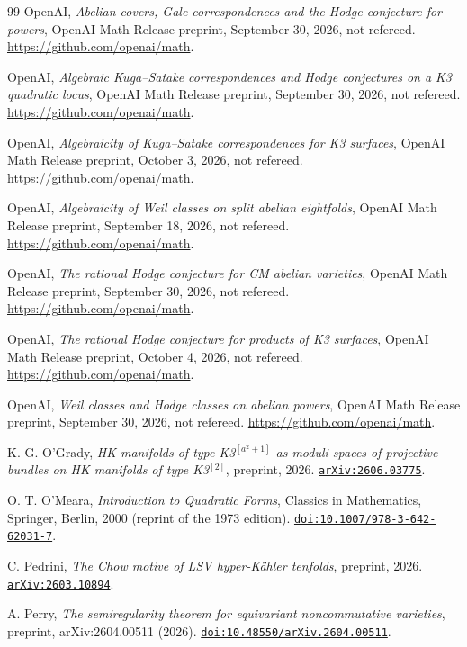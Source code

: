 \begin{thebibliography}{99}
OpenAI,
\emph{Abelian covers, Gale correspondences and the Hodge conjecture for powers},
OpenAI Math Release preprint, September 30, 2026, not refereed.
\url{https://github.com/openai/math}.

OpenAI,
\emph{Algebraic Kuga--Satake correspondences and Hodge conjectures on a K3 quadratic locus},
OpenAI Math Release preprint, September 30, 2026, not refereed.
\url{https://github.com/openai/math}.

OpenAI,
\emph{Algebraicity of Kuga--Satake correspondences for K3 surfaces},
OpenAI Math Release preprint, October 3, 2026, not refereed.
\url{https://github.com/openai/math}.

OpenAI,
\emph{Algebraicity of Weil classes on split abelian eightfolds},
OpenAI Math Release preprint, September 18, 2026, not refereed.
\url{https://github.com/openai/math}.

OpenAI,
\emph{The rational Hodge conjecture for CM abelian varieties},
OpenAI Math Release preprint, September 30, 2026, not refereed.
\url{https://github.com/openai/math}.

OpenAI,
\emph{The rational Hodge conjecture for products of K3 surfaces},
OpenAI Math Release preprint, October 4, 2026, not refereed.
\url{https://github.com/openai/math}.

OpenAI,
\emph{Weil classes and Hodge classes on abelian powers},
OpenAI Math Release preprint, September 30, 2026, not refereed.
\url{https://github.com/openai/math}.

K. G. O'Grady,
\emph{HK manifolds of type K3$^{[a^{2}+1]}$ as moduli spaces of projective
bundles on HK manifolds of type K3$^{[2]}$},
preprint, 2026.
\href{https://arxiv.org/abs/2606.03775}{\texttt{arXiv:2606.03775}}.

O. T. O'Meara,
\emph{Introduction to Quadratic Forms},
Classics in Mathematics, Springer, Berlin, 2000 (reprint of the 1973 edition).
\href{https://doi.org/10.1007/978-3-642-62031-7}{\texttt{doi:10.1007/978-3-642-62031-7}}.

C. Pedrini,
\emph{The Chow motive of LSV hyper-K\"ahler tenfolds},
preprint, 2026.
\href{https://arxiv.org/abs/2603.10894}{\texttt{arXiv:2603.10894}}.

A. Perry,
\emph{The semiregularity theorem for equivariant noncommutative varieties},
preprint, arXiv:2604.00511 (2026).
\href{https://doi.org/10.48550/arXiv.2604.00511}{\texttt{doi:10.48550/arXiv.2604.00511}}.


\end{thebibliography}
